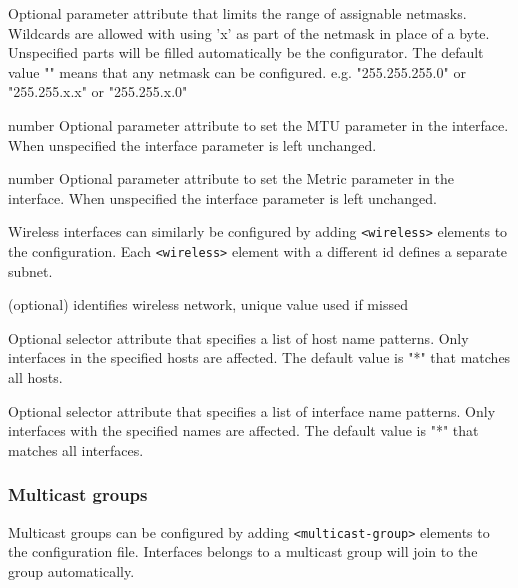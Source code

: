 \begin{compactitem}
    \item {}
      Optional parameter attribute that limits the range of assignable
      netmasks. Wildcards are allowed with using 'x' as part of the netmask
      in place of a byte. Unspecified parts will be filled automatically be
      the configurator. The default value "" means that any netmask can be
      configured.
      e.g. "255.255.255.0" or "255.255.x.x" or "255.255.x.0"

    \item {}                number
      Optional parameter attribute to set the MTU parameter in the interface.
      When unspecified the interface parameter is left unchanged.

    \item {}                number
      Optional parameter attribute to set the Metric parameter in the interface.
      When unspecified the interface parameter is left unchanged.
\end{compactitem}

Wireless interfaces can similarly be configured by adding
\verb!<wireless>! elements to the configuration. Each \verb!<wireless>!
element with a different id defines a separate subnet.
\begin{compactitem}
    \item {} (optional)
      identifies wireless network, unique value used if missed

    \item {}
      Optional selector attribute that specifies a list of host name patterns.
      Only interfaces in the specified hosts are affected. The default value
      is "*" that matches all hosts.

    \item {}
      Optional selector attribute that specifies a list of interface name
      patterns. Only interfaces with the specified names are affected. The
      default value is "*" that matches all interfaces.
\end{compactitem}


\subsubsection{Multicast groups}
\label{sec:autoconfig:multicast-groups}

Multicast groups can be configured by adding \verb!<multicast-group>!
elements to the configuration file. Interfaces belongs to a multicast
group will join to the group automatically.

